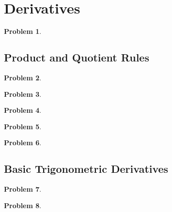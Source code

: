 \documentclass{article}
\newtheorem{problem}{Problem}
\begin{document}
\section{Derivatives}
\begin{problem}

\end{problem}
\subsection{Product and Quotient Rules}

\begin{problem}

\end{problem}


\begin{problem}

\end{problem}


\begin{problem}

\end{problem}



\begin{problem}

\end{problem}


\begin{problem}

\end{problem}

\subsection{Basic Trigonometric Derivatives}
\begin{problem}

\end{problem}
\begin{problem}

\end{problem}
\end{document}
